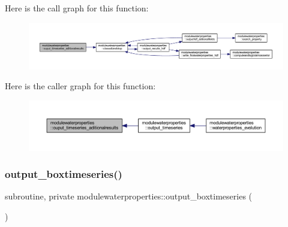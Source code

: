 Here is the call graph for this function\+:\nopagebreak
\begin{figure}[H]
\begin{center}
\leavevmode
\includegraphics[width=350pt]{namespacemodulewaterproperties_a98520e5c44c187e7d09c51cc9864bb63_cgraph}
\end{center}
\end{figure}
Here is the caller graph for this function\+:\nopagebreak
\begin{figure}[H]
\begin{center}
\leavevmode
\includegraphics[width=350pt]{namespacemodulewaterproperties_a98520e5c44c187e7d09c51cc9864bb63_icgraph}
\end{center}
\end{figure}
\mbox{\label{namespacemodulewaterproperties_a8400d7aab12081d64e14b5947eb9734c}} 
\subsubsection{\texorpdfstring{output\+\_\+boxtimeseries()}{output\_boxtimeseries()}}
{\footnotesize\ttfamily subroutine, private modulewaterproperties\+::output\+\_\+boxtimeseries (\begin{DoxyParamCaption}{ }\end{DoxyParamCaption})\hspace{0.3cm}{\ttfamily [private]}}


